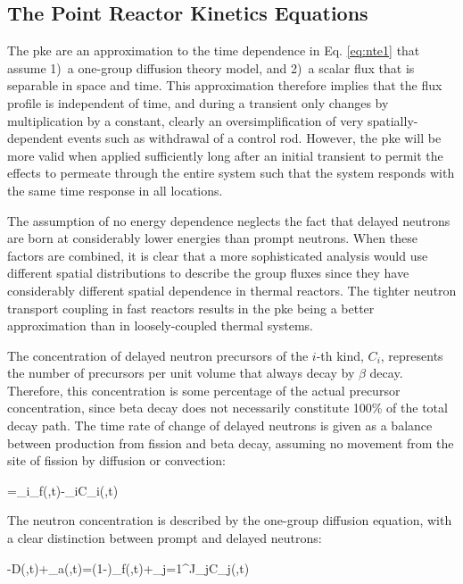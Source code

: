\subsection{The Point Reactor Kinetics Equations}
\label{sec:PKE}

The \gls{pke} are an approximation to the time dependence in Eq. \eqref{eq:nte1} that assume 1)~a one-group diffusion theory model, and 2)~a scalar flux that is separable in space and time. This approximation therefore implies that the flux profile is independent of time, and during a transient only changes by multiplication by a constant, clearly an oversimplification of very spatially-dependent events such as withdrawal of a control rod. However, the \gls{pke} will be more valid when applied sufficiently long after an initial transient to permit the effects to permeate through the entire system such that the system responds with the same time response in all locations.

The assumption of no energy dependence neglects the fact that delayed neutrons are born at considerably lower energies than prompt neutrons. When these factors are combined, it is clear that a more sophisticated analysis would use different spatial distributions to describe the group fluxes since they have considerably different spatial dependence in thermal reactors. The tighter neutron transport coupling in fast reactors results in the \gls{pke} being a better approximation than in loosely-coupled thermal systems.

The concentration of delayed neutron precursors of the \(i\)-th kind, \(C_i\), represents the number of precursors per unit volume that always decay by \(\beta\) decay. Therefore, this concentration is some percentage of the actual precursor concentration, since beta decay does not necessarily constitute 100\% of the total decay path. The time rate of change of delayed neutrons is given as a balance between production from fission and beta decay, assuming no movement from the site of fission by diffusion or convection:

\beq
\label{eq:Precursor1}
=\beta_i\nu\Sigma_f\phi(,t)-\lambda_iC_i(,t)
\eeq

The neutron concentration is described by the one-group diffusion equation, with a clear distinction between prompt and delayed neutrons:

\beq
\label{eq:Power1}
-\nabla\cdot\left\lbrack D\nabla\phi(,t)\right\rbrack+\Sigma_a\phi(,t)=(1-\beta)\nu\Sigma_f\phi(,t)+\sum_{j=1}^J\lambda_jC_j(,t)
\eeq

